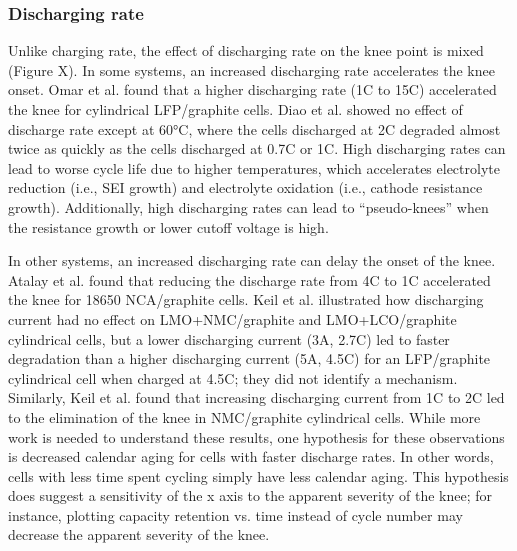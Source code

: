\documentclass[journal=jpcl, manuscript=article, layout=onecolumn]{achemso}
\begin{document}
\subsubsection{Discharging rate}

Unlike charging rate, the effect of discharging rate on the knee point is mixed (Figure X).
In some systems, an increased discharging rate
accelerates the knee onset.
Omar et al.\cite{omar_lithium_2014} found that a higher discharging rate (1C to 15C) accelerated the knee for cylindrical LFP/graphite cells.
Diao et al.\cite{diao_accelerated_2019} showed no effect of discharge rate except at 60°C, where the cells discharged at 2C degraded almost twice as quickly as the cells discharged at 0.7C or 1C.
High discharging rates can lead to worse cycle life due to higher temperatures, which accelerates electrolyte reduction (i.e., SEI growth) and electrolyte oxidation (i.e., cathode resistance growth). Additionally, high discharging rates can lead to ``pseudo-knees'' when the resistance growth or lower cutoff voltage is high.

In other systems, an increased discharging rate can delay the onset of the knee.
Atalay et al.\cite{atalay_theory_2020} found that reducing the discharge rate from 4C to 1C accelerated the knee for 18650 NCA/graphite cells.
Keil et al.\cite{keil_charging_2016} illustrated how discharging current had no effect on LMO+NMC/graphite and LMO+LCO/graphite cylindrical cells, but a lower discharging current (3A, 2.7C) led to faster degradation than a higher discharging current (5A, 4.5C) for an LFP/graphite cylindrical cell when charged at 4.5C; they did not identify a mechanism. 
Similarly, Keil et al.\cite{keil_linear_2019} found that increasing discharging current from 1C to 2C led to the elimination of the knee in NMC/graphite cylindrical cells.
While more work is needed to understand these results, one hypothesis for these observations is decreased calendar aging for cells with faster discharge rates.
In other words, cells with less time spent cycling simply have less calendar aging. This hypothesis does suggest a sensitivity of the x axis to the apparent severity of the knee; for instance, plotting capacity retention vs. time instead of cycle number may decrease the apparent severity of the knee.
\end{document}
